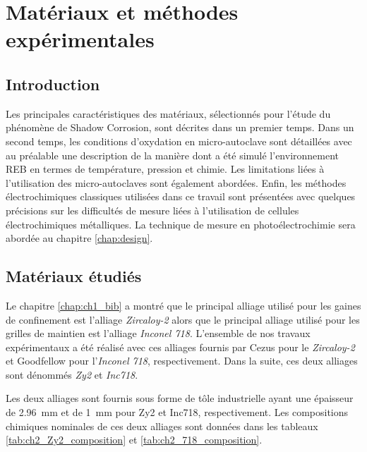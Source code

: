 

\chapter{Matériaux et méthodes expérimentales}\label{chap:methods} 
\begin{refsection}
\minitoc

\section{Introduction}
Les principales caractéristiques des matériaux, sélectionnés pour l'étude du phénomène de Shadow Corrosion, 
sont décrites dans un premier temps. 
Dans un second temps, les conditions d'oxydation
en micro-autoclave sont détaillées avec au préalable une description de la manière dont a été simulé l'environnement REB en
termes de température, pression et chimie. Les limitations liées à l'utilisation des micro-autoclaves sont
également abordées.
Enfin, les méthodes électrochimiques classiques utilisées dans ce travail sont présentées avec quelques précisions sur les
difficultés de mesure liées à l'utilisation de cellules électrochimiques métalliques. La technique de mesure en
photoélectrochimie sera abordée au chapitre \ref{chap:design}.

\section{Matériaux étudiés}\label{sec:ch2_materials}

    Le chapitre \ref{chap:ch1_bib} a montré que le principal alliage utilisé pour les gaines de confinement est l'alliage
    \emph{Zircaloy-2} alors que le principal alliage utilisé pour les grilles de maintien est l'alliage \emph{Inconel 718}. 
    L'ensemble de nos travaux expérimentaux a été réalisé avec ces alliages
    fournis par Cezus pour le \emph{Zircaloy-2} et Goodfellow pour l'\emph{Inconel 718}, respectivement. Dans la suite, ces deux
    alliages sont dénommés \emph{Zy2} et \emph{Inc718}.   
    
    Les deux alliages sont fournis sous forme de tôle industrielle ayant une épaisseur de \SI{2.96}{\milli\meter} et de
    \SI{1}{\milli\meter} pour Zy2 et Inc718, respectivement. Les compositions chimiques nominales de ces deux
    alliages sont données dans les tableaux \ref{tab:ch2_Zy2_composition} et \ref{tab:ch2_718_composition}. 


\end{refsection}
